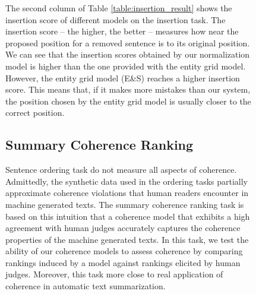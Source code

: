 \begin{figure}[!t]
The second column of Table \ref{table:insertion_result} shows the insertion score of different models on the insertion task. 
The insertion score -- the higher, the better -- measures how near the proposed position for a removed sentence is to its original position. 
We can see that the insertion scores obtained by our normalization model is higher than the one provided with the entity grid model.
However, the entity grid model (E\&S) reaches a higher insertion score. 
This means that, if it makes more mistakes than our system, the position chosen by the entity grid model is usually closer to the correct position. 


\subsection{Summary Coherence Ranking}
%
Sentence ordering task do not measure all aspects of coherence. 
Admittedly, the synthetic data used in the ordering tasks partially approximate coherence violations that human readers encounter in machine generated texts. 
The summary coherence ranking task is based on this intuition that a coherence model that exhibits a high agreement with human judges accurately captures the coherence properties of the machine generated texts. 
In this task, we test the ability of our coherence models to assess coherence by comparing rankings induced by a model against rankings elicited by human judges. 
Moreover, this task more close to real application of coherence in automatic text summarization.


\end{figure}
